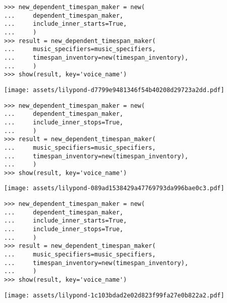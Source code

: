 \begin{singlespacing}
\vspace{-0.5\baselineskip}
\begin{lstlisting}
>>> new_dependent_timespan_maker = new(
...     dependent_timespan_maker,
...     include_inner_starts=True,
...     )
>>> result = new_dependent_timespan_maker(
...     music_specifiers=music_specifiers,
...     timespan_inventory=new(timespan_inventory),
...     )
>>> show(result, key='voice_name')
\end{lstlisting}
\noindent\texttt{[image: assets/lilypond-d7799e9481346f54b40208d29723a2dd.pdf]}
\end{singlespacing}

\begin{comment}
<abjad>
new_dependent_timespan_maker = new(
    dependent_timespan_maker,
    include_inner_stops=True,
    )
result = new_dependent_timespan_maker(
    music_specifiers=music_specifiers,
    timespan_inventory=new(timespan_inventory),
    )
show(result, key='voice_name')
</abjad>
\end{comment}

\begin{singlespacing}
\vspace{-0.5\baselineskip}
\begin{lstlisting}
>>> new_dependent_timespan_maker = new(
...     dependent_timespan_maker,
...     include_inner_stops=True,
...     )
>>> result = new_dependent_timespan_maker(
...     music_specifiers=music_specifiers,
...     timespan_inventory=new(timespan_inventory),
...     )
>>> show(result, key='voice_name')
\end{lstlisting}
\noindent\texttt{[image: assets/lilypond-089ad1538429a47769793da996bae0c3.pdf]}
\end{singlespacing}

\begin{comment}
<abjad>
new_dependent_timespan_maker = new(
    dependent_timespan_maker,
    include_inner_starts=True,
    include_inner_stops=True,
    )
result = new_dependent_timespan_maker(
    music_specifiers=music_specifiers,
    timespan_inventory=new(timespan_inventory),
    )
show(result, key='voice_name')
</abjad>
\end{comment}

\begin{singlespacing}
\vspace{-0.5\baselineskip}
\begin{lstlisting}
>>> new_dependent_timespan_maker = new(
...     dependent_timespan_maker,
...     include_inner_starts=True,
...     include_inner_stops=True,
...     )
>>> result = new_dependent_timespan_maker(
...     music_specifiers=music_specifiers,
...     timespan_inventory=new(timespan_inventory),
...     )
>>> show(result, key='voice_name')
\end{lstlisting}
\noindent\texttt{[image: assets/lilypond-1c103bdad2e02d823f99fa27e0b822a2.pdf]}
\end{singlespacing}

